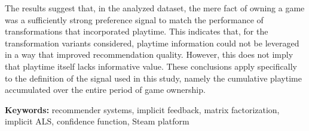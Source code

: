 The results suggest that, in the analyzed dataset, the mere fact of owning a game was a sufficiently strong preference signal to match the performance of transformations that incorporated playtime. This indicates that, for the transformation variants considered, playtime information could not be leveraged in a way that improved recommendation quality. However, this does not imply that playtime itself lacks informative value. These conclusions apply specifically to the definition of the signal used in this study, namely the cumulative playtime accumulated over the entire period of game ownership.

\vspace{1em}
\noindent\textbf{Keywords:} recommender systems, implicit feedback, matrix factorization, implicit ALS, confidence function, Steam platform
